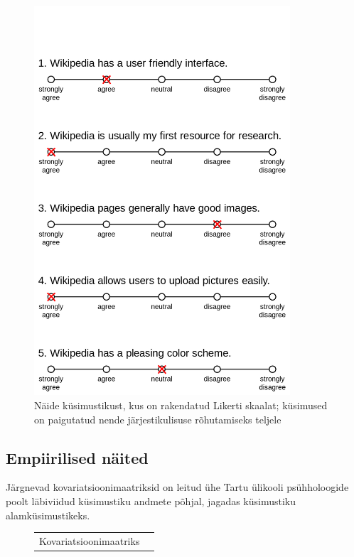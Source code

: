 \documentclass[a4paper,12pt,oneside]{article}
\numberwithin{equation}{section}
\theoremstyle{definition}
\begin{document}
\begin{subappendices}
\begin{figure}[H]
\centering
\includegraphics[width=0.85\textwidth]{Example_Likert_Scale.png}
\caption{Näide k\"usimustikust, kus on rakendatud Likerti skaalat; k\"usimused on paigutatud nende järjestikulisuse rõhutamiseks teljele\cite{Smith}}
\label{likert2}
\end{figure}



\subsection{Empiirilised näited}
\label{appendix:empiric}

Järgnevad kovariatsioonimaatriksid on leitud ühe Tartu ülikooli psühholoogide poolt läbiviidud küsimustiku andmete põhjal, jagadas küsimustiku alam\-küsimus\-tikeks. 


\begin{figure}[H]
\begin{small}
\begin{center} 
\begin{tabular} { r r r r r r r r r r r r r }
 \multicolumn{ 12 }{l}{ Kovariatsioonimaatriks} \cr
 \hline 


\end{tabular}
\end{center}
\end{small}
\end{figure}
\end{subappendices}
\end{document}
